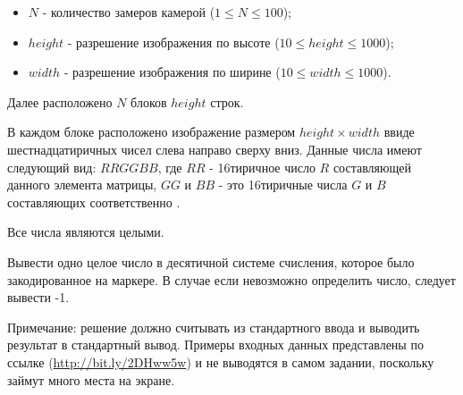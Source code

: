 \begin{itemize}
    \item $N$ - количество замеров камерой ($1 \leq N \leq 100$);
    \item $height$ - разрешение изображения по высоте ($10 \leq height \leq 1000$);
    \item $width$ - разрешение изображения по ширине ($10 \leq width \leq 1000$).
\end{itemize}

Далее расположено $N$ блоков $ height $ строк.

В каждом блоке расположено изображение размером $height \times width$ ввиде шестнадцатиричных чисел слева 
направо сверху вниз. Данные числа имеют следующий вид: $RRGGBB$, где $RR$ - 16тиричное число $R$ составляющей 
данного элемента матрицы, $GG$ и $BB$ - это 16тиричные числа $G$ и $B$ составляющих соответственно .

Все числа являются целыми.

\outputfmtSection

Вывести одно целое число в десятичной системе счисления, которое было закодированное на маркере. 
В случае если невозможно определить число, следует вывести -1.

Примечание: решение должно считывать из стандартного ввода и выводить результат в стандартный вывод. 
Примеры входных данных представлены по ссылке (\url{http://bit.ly/2DHww5w}) и не выводятся в самом задании, поскольку займут много места на экране.

